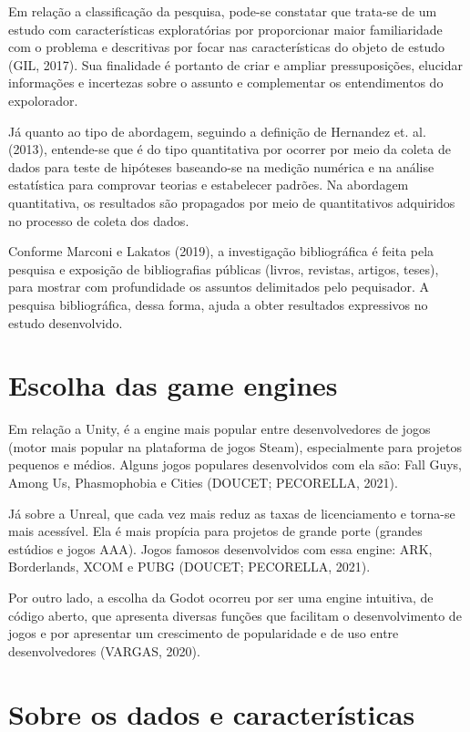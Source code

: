 Em relação a classificação da pesquisa, pode-se constatar que trata-se de um estudo com características exploratórias por proporcionar maior familiaridade com o problema e descritivas por focar nas características do objeto de estudo (GIL, 2017). Sua finalidade é portanto de criar e ampliar pressuposições, elucidar informações e incertezas sobre o assunto e complementar os entendimentos do expolorador.

Já quanto ao tipo de abordagem, seguindo a definição de Hernandez et. al. (2013)\nocite{hernandez2013}, entende-se que é do tipo quantitativa por ocorrer por meio da coleta de dados para teste de hipóteses baseando-se na medição numérica e na análise estatística para comprovar teorias e estabelecer padrões. Na abordagem quantitativa, os resultados são propagados por meio de quantitativos adquiridos no processo de coleta dos dados.

Conforme Marconi e Lakatos (2019)\nocite{marconi2019}, a investigação bibliográfica é feita pela pesquisa e exposição de bibliografias públicas (livros, revistas, artigos, teses), para mostrar com profundidade os assuntos delimitados pelo pequisador. A pesquisa bibliográfica, dessa forma, ajuda a obter resultados expressivos no estudo desenvolvido. 

\section{Escolha das game engines}
\label{sec:escolha-das-game-engines}

Em relação a Unity, é a engine mais popular entre desenvolvedores de jogos (motor mais popular na plataforma de jogos Steam), especialmente para projetos pequenos e médios. Alguns jogos populares desenvolvidos com ela são: Fall Guys, Among Us, Phasmophobia e Cities (DOUCET; PECORELLA, 2021)\nocite{lars2021}.

Já sobre a Unreal, que cada vez mais reduz as taxas de licenciamento e torna-se mais acessível. Ela é mais propícia para projetos de grande porte (grandes estúdios e jogos AAA). Jogos famosos desenvolvidos com essa engine: ARK, Borderlands, XCOM e PUBG (DOUCET; PECORELLA, 2021).

Por outro lado, a escolha da Godot ocorreu por ser uma engine intuitiva, de código aberto, que apresenta diversas funções que facilitam o desenvolvimento de jogos e por apresentar um crescimento de popularidade e de uso entre desenvolvedores (VARGAS, 2020)\nocite{vargas2020}. 

\section{Sobre os dados e características}
\label{sec:sobre-os-dados}


